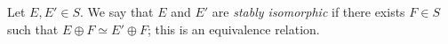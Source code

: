 Let $E, E' \in S$. We say that $E$ and $E'$ are \emph{stably isomorphic} if there exists $F \in S$ such that $E \oplus F \simeq E' \oplus F$; this is an equivalence relation.
